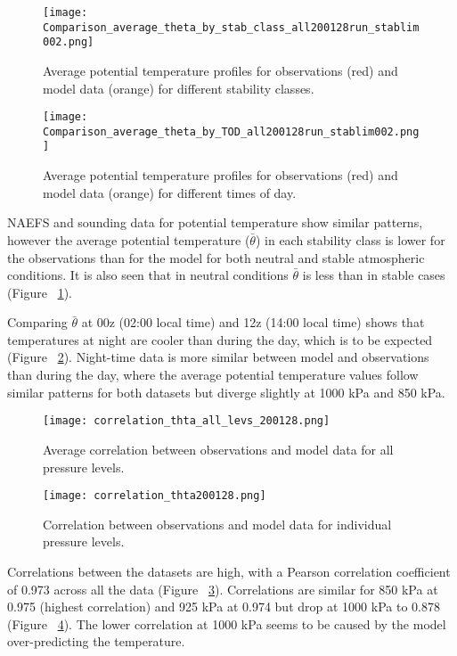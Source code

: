 \documentclass[12pt]{article}
\begin{document}
\begin{figure}[h]
    \centering
    \texttt{[image: Comparison\_average\_theta\_by\_stab\_class\_all200128run\_stablim002.png]}
    \caption{Average potential temperature profiles for observations (red) and model data (orange) 
    for different stability classes.}
    \label{fig:stab_class}
\end{figure}

\begin{figure}[h]
    \centering
    \texttt{[image: Comparison\_average\_theta\_by\_TOD\_all200128run\_stablim002.png]}
    \caption{Average potential temperature profiles for observations (red) and model data (orange) 
    for different times of day.}
    \label{fig:tod}
\end{figure}

NAEFS and sounding data for potential temperature show similar patterns, however the average 
potential temperature ($\bar{\theta}$) in each stability class is lower for the observations than for the 
model for both neutral and stable atmospheric conditions. It is also seen that in neutral conditions 
$\bar{\theta}$ is less than in stable cases (Figure ~\ref{fig:stab_class}).

Comparing $\bar{\theta}$ at 00z (02:00 local time) and 12z (14:00 local time) shows that 
temperatures at night are cooler than during the day, which is to be expected (Figure ~\ref{fig:tod}). 
Night-time data is more similar between model and observations than during the day, where 
the average potential temperature values follow similar patterns for both datasets but diverge 
slightly at 1000 kPa and 850 kPa. 


\begin{figure}[h]
    \centering
    \texttt{[image: correlation\_thta\_all\_levs\_200128.png]}
    \caption{Average correlation between observations and model data for all pressure levels.}
    \label{fig:corr_all}
\end{figure}

\begin{figure}[h]
    \centering
    \texttt{[image: correlation\_thta200128.png]}
    \caption{Correlation between observations and model data for individual pressure levels.}
    \label{fig:corr_mult}
\end{figure}



Correlations between the datasets are high, with a Pearson correlation coefficient of 0.973 
across all the data (Figure ~\ref{fig:corr_all}). Correlations are similar for 850 kPa at 0.975 
(highest correlation) and 925 kPa at 0.974 but drop at 1000 kPa to 0.878 
(Figure ~\ref{fig:corr_mult}). The lower correlation at 1000 kPa seems to be caused by the model 
over-predicting the temperature.  
\end{document}
